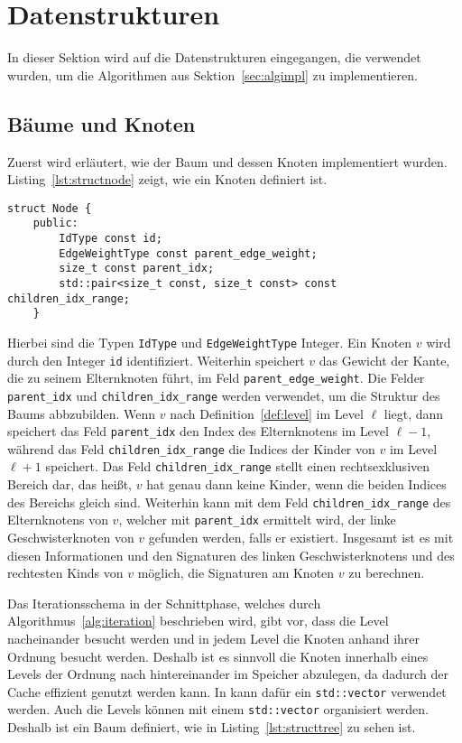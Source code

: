 \section{Datenstrukturen}
In dieser Sektion wird auf die Datenstrukturen eingegangen, die verwendet wurden, um die Algorithmen aus Sektion~\ref{sec:algimpl} zu implementieren.
\subsection{Bäume und Knoten}
Zuerst wird erläutert, wie der Baum und dessen Knoten implementiert wurden.
Listing~\ref{lst:structnode} zeigt, wie ein Knoten definiert ist.
\begin{lstlisting}[caption={Definition von \texttt{struct Node}}, label={lst:structnode}]
struct Node {
    public:
        IdType const id;
        EdgeWeightType const parent_edge_weight;
        size_t const parent_idx;
        std::pair<size_t const, size_t const> const children_idx_range;
    }
\end{lstlisting}

Hierbei sind die Typen \texttt{IdType} und \texttt{EdgeWeightType} Integer.
Ein Knoten $v$ wird durch den Integer \texttt{id} identifiziert. 
Weiterhin speichert $v$ das Gewicht der Kante, die zu seinem Elternknoten führt, im Feld \texttt{parent\_edge\_weight}.
Die Felder \texttt{parent\_idx} und \texttt{children\_idx\_range} werden verwendet, um die Struktur des Baums abbzubilden.
Wenn $v$ nach Definition~\ref{def:level} im Level $\ell$ liegt, dann speichert das Feld \texttt{parent\_idx} den Index des Elternknotens im Level $\ell-1$, während das Feld \texttt{children\_idx\_range} die Indices der Kinder von $v$ im Level $\ell+1$ speichert.
Das Feld \texttt{children\_idx\_range} stellt einen rechtsexklusiven Bereich dar, das heißt, $v$ hat genau dann keine Kinder, wenn die beiden Indices des Bereichs gleich sind.
Weiterhin kann mit dem Feld \texttt{children\_idx\_range} des Elternknotens von $v$, welcher mit \texttt{parent\_idx} ermittelt wird, der linke Geschwisterknoten von $v$ gefunden werden, falls er existiert.
Insgesamt ist es mit diesen Informationen und den Signaturen des linken Geschwisterknotens und des rechtesten Kinds von $v$ möglich, die Signaturen am Knoten $v$ zu berechnen.

Das Iterationsschema in der Schnittphase, welches durch Algorithmus~\ref{alg:iteration} beschrieben wird, gibt vor, dass die Level nacheinander besucht werden und in jedem Level die Knoten anhand ihrer Ordnung besucht werden.
Deshalb ist es sinnvoll die Knoten innerhalb eines Levels der Ordnung nach hintereinander im Speicher abzulegen, da dadurch der Cache effizient genutzt werden kann.
In \Cpp{} kann dafür ein \texttt{std::vector} verwendet werden.
Auch die Levels können mit einem \texttt{std::vector} organisiert werden.
Deshalb ist ein Baum definiert, wie in Listing~\ref{lst:structtree} zu sehen ist.

